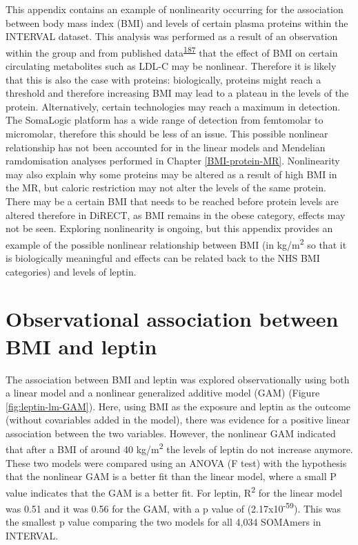 \documentclass[11pt,twoside]{bristolthesis}
\begin{document}
This appendix contains an example of nonlinearity occurring for the association between body mass index (BMI) and levels of certain plasma proteins within the INTERVAL dataset. This analysis was performed as a result of an observation within the group and from published data\textsuperscript{\protect\hyperlink{ref-Li2021}{187}} that the effect of BMI on certain circulating metabolites such as LDL-C may be nonlinear. Therefore it is likely that this is also the case with proteins: biologically, proteins might reach a threshold and therefore increasing BMI may lead to a plateau in the levels of the protein. Alternatively, certain technologies may reach a maximum in detection. The SomaLogic platform has a wide range of detection from femtomolar to micromolar, therefore this should be less of an issue. This possible nonlinear relationship has not been accounted for in the linear models and Mendelian ramdomisation analyses performed in Chapter \ref{BMI-protein-MR}. Nonlinearity may also explain why some proteins may be altered as a result of high BMI in the MR, but caloric restriction may not alter the levels of the same protein. There may be a certain BMI that needs to be reached before protein levels are altered therefore in DiRECT, as BMI remains in the obese category, effects may not be seen. Exploring nonlinearity is ongoing, but this appendix provides an example of the possible nonlinear relationship between BMI (in kg/m\textsuperscript{2} so that it is biologically meaningful and effects can be related back to the NHS BMI categories) and levels of leptin.

\hypertarget{observational-association-between-bmi-and-leptin}{%
\section{Observational association between BMI and leptin}\label{observational-association-between-bmi-and-leptin}}

The association between BMI and leptin was explored observationally using both a linear model and a nonlinear generalized additive model (GAM) (Figure \ref{fig:leptin-lm-GAM}). Here, using BMI as the exposure and leptin as the outcome (without covariables added in the model), there was evidence for a positive linear association between the two variables. However, the nonlinear GAM indicated that after a BMI of around 40 kg/m\textsuperscript{2} the levels of leptin do not increase anymore. These two models were compared using an ANOVA (F test) with the hypothesis that the nonlinear GAM is a better fit than the linear model, where a small P value indicates that the GAM is a better fit. For leptin, R\textsuperscript{2} for the linear model was 0.51 and it was 0.56 for the GAM, with a p value of (2.17x10\textsuperscript{-59}). This was the smallest p value comparing the two models for all 4,034 SOMAmers in INTERVAL.
\end{document}
